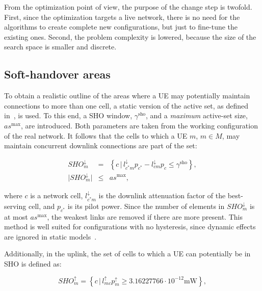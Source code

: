 From the optimization point of view, the purpose of the change step
is twofold. First, since the optimization targets a live network,
there is no need for the algorithms to create complete new configurations,
but just to fine-tune the existing ones. Second, the problem complexity
is lowered, because the size of the search space is smaller and discrete.


\subsection{Soft-handover areas \label{sub:07-SHO_areas}}

To obtain a realistic outline of the areas where a UE may potentially
maintain connections to more than one cell, a static version of the
active set, as defined in~\cite{Nawrocki-Understanding_UMTS_radio_network_modelling_and_optimisation:2006},
is used. To this end, a SHO window, $\gamma^{\mathrm{sho}}$,
and a \textit{\emph{maximum}} active-set size, $as^{\mathrm{max}}$,
are introduced. Both parameters are taken from the working configuration
of the real network. It follows that the cells to which a UE $m$,
$m\in M$, may maintain concurrent downlink connections are part of
the set:

\begin{eqnarray}
SHO_{m}^{\downarrow} & = & \left\{ c\,\vert\, l_{c^{*}m}^{\downarrow}p_{c^{*}}-l_{cm}^{\downarrow}p_{c}\le\gamma^{\mathrm{sho}}\right\} ,\nonumber \\
\vert SHO_{m}^{\downarrow}\vert & \le & as^{\mathrm{max}},
\end{eqnarray}


\noindent where $c$ is a network cell, $l_{c^{*}m}^{\downarrow}$
is the downlink attenuation factor of the best-serving cell, and $p_{c^{*}}$
is its pilot power. Since the number of elements in $SHO_{m}^{\downarrow}$
is at most $as^{\mathrm{max}}$, the weakest links are removed if
there are more present. This method is well suited for configurations
with no hysteresis, since dynamic effects are ignored in static models~\cite{Nawrocki-Understanding_UMTS_radio_network_modelling_and_optimisation:2006}. 

Additionally, in the uplink, the set of cells to which a UE can potentially
be in SHO is defined as:

\begin{equation}
SHO_{m}^{\uparrow}=\left\{ c\,\vert\, l_{mc}^{\uparrow}p_{m}^{\uparrow}\ge3.16227766\cdot10^{-12}\mathrm{mW}\right\} ,
\end{equation}


